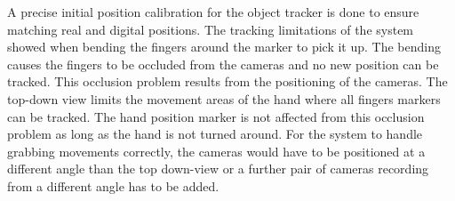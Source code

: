 A precise initial position calibration for the object tracker is done to ensure matching real and digital positions. The tracking limitations of the system showed when bending the fingers around the marker to pick it up. The bending causes the fingers to be occluded from the cameras and no new position can be tracked. This occlusion problem results from the positioning of the cameras. The top-down view limits the movement areas of the hand where all fingers markers can be tracked. The hand position marker is not affected from this occlusion problem as long as the hand is not turned around.
For the system to handle grabbing movements correctly, the cameras would have to be positioned at a different angle than the top down-view or a further pair of cameras recording from a different angle has to be added.
